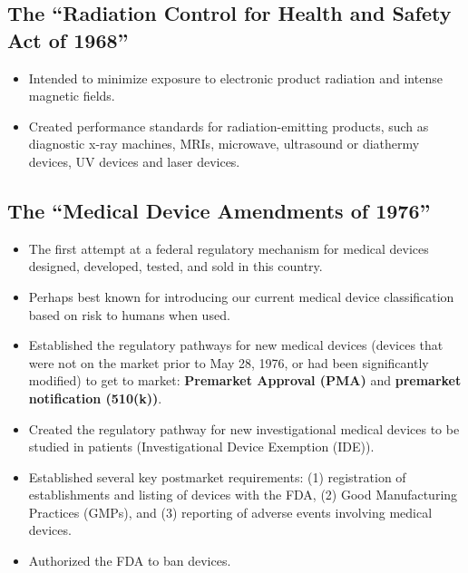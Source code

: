 \documentclass[11pt]{book}
\begin{document}
\subsection{The ``Radiation Control for Health and Safety Act of 1968''}
\begin{itemize}
	\item Intended to minimize exposure to electronic product radiation and intense magnetic fields.
	\item Created performance standards for radiation-emitting products, such as diagnostic x-ray machines, MRIs, microwave, ultrasound or diathermy devices, UV devices and laser devices.
\end{itemize}

\subsection{The ``Medical Device Amendments of 1976''}
\begin{itemize}
	\item The first attempt at a federal regulatory mechanism for medical devices designed, developed, tested, and sold in this country.
	\item Perhaps best known for introducing our current medical device classification based on risk to humans when used.
	\item Established the regulatory pathways for new medical devices (devices that were not on the market prior to May 28, 1976, or had been significantly modified) to get to market: \textbf{Premarket Approval (PMA)} and \textbf{premarket notification (510(k))}.
	\item Created the regulatory pathway for new investigational medical devices to be studied in patients (Investigational Device Exemption (IDE)).
	\item Established several key postmarket requirements: (1) registration of establishments and listing of devices with the FDA, (2) Good Manufacturing Practices (GMPs), and (3) reporting of adverse events involving medical devices.
	\item Authorized the FDA to ban devices.
\end{itemize}
\end{document}
